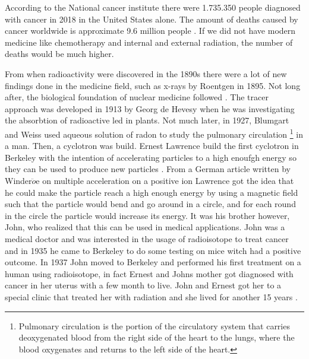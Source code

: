 \documentclass[twoside,english]{uiofysmaster/uiofysmaster}
\begin{document}
According to the National cancer institute \cite{history_medicine} there were 1.735.350 people diagnosed with cancer in 2018 in the United States alone. The amount of deaths caused by cancer worldwide is approximate 9.6 million people \cite{WHO}. If we did not have modern medicine like chemotherapy and internal and external radiation, the number of deaths would be much higher. 
\par
From when radioactivity were discovered in the 1890s there were a lot of new findings done in the medicine field, such as x-rays by Roentgen in 1895. Not long after, the biological foundation of nuclear medicine followed \cite{Cherry2012_chap1}. The tracer approach was developed in 1913 by Georg de Hevesy \cite{Hevesy2014} when he was investigating the absorbtion of radioactive led in plants. Not much later, in 1927, Blumgart and Weiss \cite{Blumgart1927} used aqueous solution of radon to study the pulmonary circulation \footnote{Pulmonary circulation is the portion of the circulatory system that carries deoxygenated blood from the right side of the heart to the lungs, where the blood oxygenates and returns to the left side of the heart.} in a man. Then, a cyclotron was build. Ernest Lawrence build the first cyclotron in Berkeley with the intention of accelerating particles to a high enouƒgh energy so they can be used to produce new particles \cite{E.Lawrence}. From a German article written by Winder$\ddot{o}$e on multiple acceleration on a positive ion Lawrence got the idea that he could make the particle reach a high enough energy by using a magnetic field such that the particle would bend and go around in a circle, and for each round in the circle the particle would increase its energy. It was his brother however, John, who realized that this can be used in medical applications. John was a medical doctor and was interested in the usage of radioisotope to treat cancer and in 1935 he came to Berkeley to do some testing on mice witch had a positive outcome. In 1937 John moved to Berkeley and performed his first treatment on a human using radioisotope, in fact Ernest and Johns mother got diagnosed with cancer in her uterus with a few month to live. John and Ernest got her to a special clinic that treated her with radiation and she lived for another 15 years \cite{E.Lawrence}. 
\end{document}
